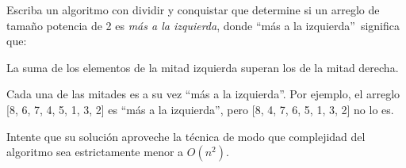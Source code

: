 \label{mali}
Escriba un algoritmo con dividir y conquistar que determine si un arreglo de tamaño potencia de 2 es \emph{más a la izquierda}, donde ``más a la izquierda''\ significa que:
\item La suma de los elementos de la mitad izquierda superan los de la mitad derecha.
\item Cada una de las mitades es a su vez ``más a la izquierda''.
Por ejemplo, el arreglo [8, 6, 7, 4, 5, 1, 3, 2] es ``más a la izquierda'', pero [8, 4, 7, 6, 5, 1, 3, 2] no lo es.

Intente que su solución aproveche la técnica de modo que
complejidad del algoritmo sea estrictamente menor a $O(n^2)$.



